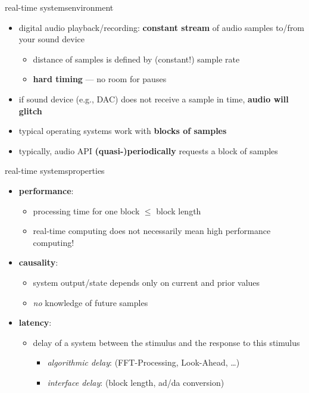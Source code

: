 	\begin{frame}{real-time systems}{environment}
		\begin{itemize}
			\item	digital audio playback/recording: \textbf{constant stream} of audio samples to/from your sound device
				\begin{itemize}
					\item	distance of samples is defined by (constant!) sample rate
					\item \textbf{hard timing} --- no room for pauses
				\end{itemize}
			\item	if sound device (e.g., DAC) does not receive a sample in time, \textbf{audio will glitch}
			\bigskip
			\item<2-> typical operating systems work with \textbf{blocks of samples}
			\item<2-> typically, audio API \textbf{(quasi-)periodically} requests a block of samples	
		\end{itemize}
	\end{frame}
	
	\begin{frame}{real-time systems}{properties}
		\begin{itemize}
			\item	\textbf{performance}:
				\begin{itemize}
					\item	processing time for one block $\leq$ block length
                    \pause
                    \item   real-time computing does not necessarily mean high performance computing!
				\end{itemize}
			\bigskip
            \pause
			\item	\textbf{causality}:
				\begin{itemize}
                    \item   system output/state depends only on current and prior values
					\item	\textit{no} knowledge of future samples
				\end{itemize}
			\bigskip
			\pause
			\item	\textbf{latency}:
				\begin{itemize}
					\item	delay of a system between the stimulus and the response to
this stimulus
						\begin{itemize}
							\item	\textit{algorithmic delay}: (FFT-Processing, Look-Ahead, \ldots)
							\item	\textit{interface delay}: (block length, ad/da conversion)
						\end{itemize}
				\end{itemize}

		\end{itemize}
	\end{frame}

